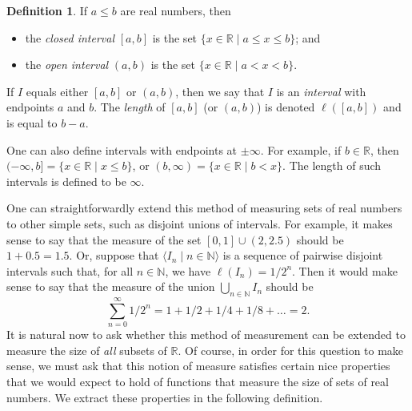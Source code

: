 \documentclass[a4paper]{memoir}
\theoremstyle{definition}
\newtheorem{definition}[theorem]{Definition}
\newcommand{\bb}{\mathbb}
\begin{document}
\begin{definition}
  If $a \leq b$ are real numbers, then 
  \begin{itemize}
    \item the \emph{closed interval} $[a,b]$ is the set $\{x \in \mathbb{R} \mid a \leq x \leq b\}$; and 
    \item the \emph{open interval} $(a,b)$ is the set $\{x \in \mathbb{R} \mid a < x < b\}$.
  \end{itemize}
  If $I$ equals either $[a,b]$ or $(a,b)$, then we say that $I$ is an \emph{interval} with 
  endpoints $a$ and $b$.
  The \emph{length} of $[a,b]$ (or $(a,b)$) is denoted $\ell([a,b])$ and is equal to 
  $b - a$.
\end{definition}

One can also define intervals with endpoints at $\pm \infty$. For example, if $b \in \bb{R}$, then 
$(-\infty, b] = \{x \in \mathbb{R} \mid x \leq b\}$, or 
$(b,\infty) = \{x \in \mathbb{R} \mid b < x\}$. The length of such intervals is defined to be 
$\infty$.

One can straightforwardly extend this method of measuring sets of real numbers to other simple sets, 
such as disjoint unions of intervals. For example, it makes sense to say that the measure of the 
set $[0,1] \cup (2, 2.5)$ should be $1 + 0.5 = 1.5$. Or, suppose that 
$\langle I_n \mid n \in \mathbb{N} \rangle$ is a sequence of pairwise disjoint intervals such that, 
for all $n \in \mathbb{N}$, we have $\ell(I_n) = 1/2^n$. Then it would make sense to say that the 
measure of the union $\bigcup_{n \in \mathbb{N}} I_n$ should be
\[
  \sum_{n = 0}^\infty 1/2^n = 1 + 1/2 + 1/4 + 1/8 + \ldots = 2.
\]
It is natural now to ask whether this method of measurement can be extended to measure the size 
of \emph{all} subsets of $\mathbb{R}$. Of course, in order for this question to make sense, we must 
ask that this notion of measure satisfies certain nice properties that we would expect to hold of 
functions that measure the size of sets of real numbers. We extract these properties in the 
following definition.
\end{document}
